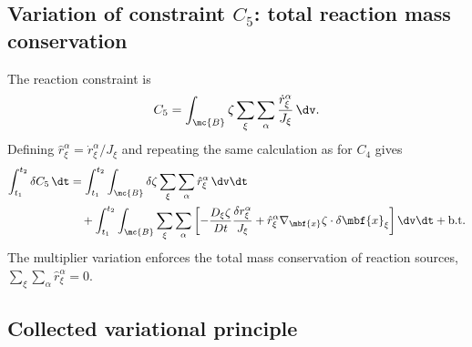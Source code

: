 \subsection{Variation of constraint $C_5$: total reaction mass conservation}
\label{sec:var_C5_app}

The reaction constraint is
\begin{equation}
  C_5 = \int_{\mc{B}} \zeta \sum_\xi\sum_\alpha \frac{\dot r_\xi^\alpha}{J_\xi}\,\dv.
  \label{eq:c5_var}
\end{equation}
Defining $\hat r_\xi^\alpha=\dot r_\xi^\alpha/J_\xi$ and repeating the same calculation as for $C_4$ gives
\begin{align}
  \int_{t_1}^{t_2}\delta C_5\,\dt
  &= \int_{t_1}^{t_2}\int_{\mc{B}} \delta\zeta\sum_\xi\sum_\alpha \hat r_\xi^\alpha \,\dv\dt \notag \\
  &\quad + \int_{t_1}^{t_2}\int_{\mc{B}} \sum_\xi\sum_\alpha \left[-\frac{D_\xi\zeta}{Dt}\frac{\delta r_\xi^\alpha}{J_\xi} + \hat r_\xi^\alpha\nabla_{\mbf{x}}\zeta\cdot\delta\mbf{x}_\xi\right]\dv\dt + \text{b.t.}
  \label{eq:c5_variation}
\end{align}
The multiplier variation enforces the total mass conservation of reaction sources, $\sum_\xi\sum_\alpha \hat r_\xi^\alpha=0$.

\subsection{Collected variational principle}
\label{sec:collected_var}

